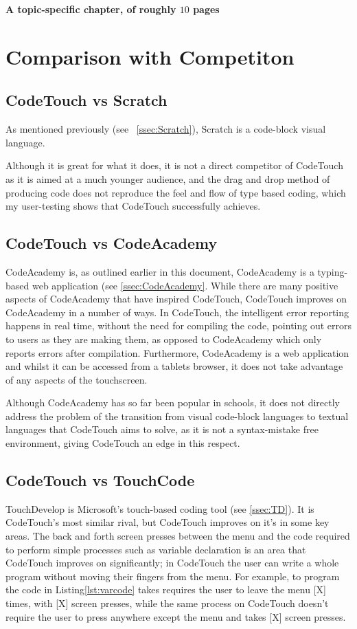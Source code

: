 \documentclass[ %
                    author={Jonathan Rankin},
                supervisor={Dr. David May, Dr. Ian Holyer},
                    degree={MEng},
                     title={CodeTouch},
                  subtitle={A Revolutionary Way To Program Real Code On Touch Screen Devices},
                      type={enterprise},
                      year={2015 } ]{dissertation}
\begin{document}
{\bf A topic-specific chapter, of roughly $10$ pages} 
\vspace{1cm} 

\noindent

\section{Comparison with Competiton}
\subsection{CodeTouch vs Scratch}
As mentioned previously (see ~\ref{ssec:Scratch}), Scratch is a code-block visual language. 

Although it is great for what it does, it is not a direct competitor of CodeTouch as it is aimed at a much younger audience, and the drag and drop method of producing code does not reproduce the feel and flow of type based coding, which my user-testing shows that CodeTouch successfully achieves. 

\subsection{CodeTouch vs CodeAcademy}

CodeAcademy is, as outlined earlier in this document, CodeAcademy is a typing-based web application (see \ref{ssec:CodeAcademy}. While there are many positive aspects of CodeAcademy that have inspired CodeTouch, CodeTouch improves on CodeAcademy in a number of ways. In CodeTouch, the intelligent error reporting happens in real time, without the need for compiling the code, pointing out errors to users as they are making them, as opposed to CodeAcademy which only reports errors after compilation. Furthermore, CodeAcademy is a web application and whilst it can be accessed from a tablets browser, it does not take advantage of any aspects of the touchscreen. 

Although CodeAcademy has so far been popular in schools, it does not directly address the problem of the transition from visual code-block languages to textual languages that CodeTouch aims to solve, as it is not a syntax-mistake free environment, giving CodeTouch an edge in this respect.


\subsection{CodeTouch vs TouchCode}
TouchDevelop is Microsoft's touch-based coding tool (see \ref{ssec:TD}). It is CodeTouch's most similar rival, but CodeTouch improves on it's in some key areas. The back and forth screen presses between the menu and the code required to perform simple processes such as variable declaration is an area that CodeTouch improves on significantly; in CodeTouch the user can write a whole program without moving their fingers from the menu. For example, to program the code in Listing\ref{lst:varcode} takes requires the user to leave the menu [X] times, with [X] screen presses, while the same process on CodeTouch doesn't require the user to press anywhere except the menu and takes [X] screen presses. 
\end{document}
